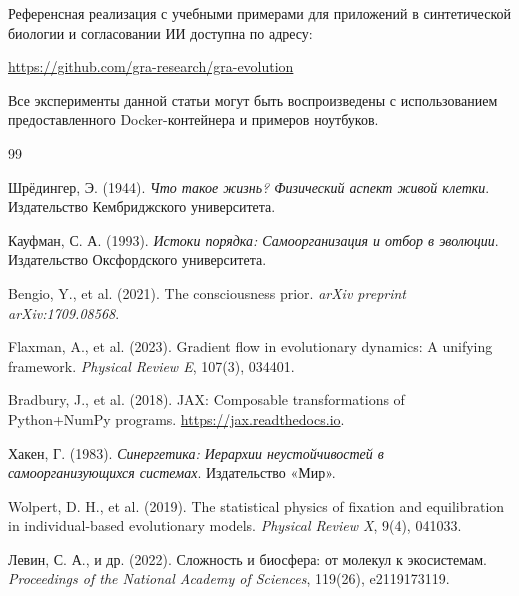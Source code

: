 \documentclass[11pt,a4paper]{article}
\theoremstyle{plain}
\theoremstyle{definition}
\theoremstyle{remark}
\begin{document}
Референсная реализация с учебными примерами для приложений в синтетической биологии и согласовании ИИ доступна по адресу:
\begin{center}
\url{https://github.com/gra-research/gra-evolution}
\end{center}
Все эксперименты данной статьи могут быть воспроизведены с использованием предоставленного Docker-контейнера и примеров ноутбуков.

\begin{thebibliography}{99}

Шрёдингер, Э. (1944).
\newblock \textit{Что такое жизнь? Физический аспект живой клетки}.
\newblock Издательство Кембриджского университета.

Кауфман, С. А. (1993).
\newblock \textit{Истоки порядка: Самоорганизация и отбор в эволюции}.
\newblock Издательство Оксфордского университета.

Bengio, Y., et al. (2021).
\newblock The consciousness prior.
\newblock \textit{arXiv preprint arXiv:1709.08568}.

Flaxman, A., et al. (2023).
\newblock Gradient flow in evolutionary dynamics: A unifying framework.
\newblock \textit{Physical Review E}, 107(3), 034401.

Bradbury, J., et al. (2018).
\newblock JAX: Composable transformations of Python+NumPy programs.
\newblock \url{https://jax.readthedocs.io}.

Хакен, Г. (1983).
\newblock \textit{Синергетика: Иерархии неустойчивостей в самоорганизующихся системах}.
\newblock Издательство «Мир».

Wolpert, D. H., et al. (2019).
\newblock The statistical physics of fixation and equilibration in individual-based evolutionary models.
\newblock \textit{Physical Review X}, 9(4), 041033.

Левин, С. А., и др. (2022).
\newblock Сложность и биосфера: от молекул к экосистемам.
\newblock \textit{Proceedings of the National Academy of Sciences}, 119(26), e2119173119.

\end{thebibliography}

\end{document}

